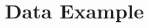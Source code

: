 \documentclass[11pt]{article}
\begin{document}
%
%
%
%
%




\section{Data Example}\label{sec: real data analysis}
\end{document}
